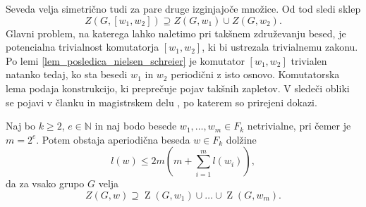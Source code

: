   Seveda velja simetrično tudi za pare druge izginjajoče množice. Od tod sledi sklep \begin{equation*}
  Z(G, [w_1, w_2]) \supseteq Z(G, w_1) \cup Z(G, w_2).
  \end{equation*}  
Glavni problem, na katerega lahko naletimo pri takšnem združevanju besed, je potencialna trivialnost komutatorja $[w_1, w_2]$, ki bi ustrezala trivialnemu zakonu.
Po lemi \ref{lem_posledica_nielsen_schreier} je komutator $[w_1, w_2]$ trivialen natanko tedaj, ko sta besedi $w_1$ in $w_2$ periodični z isto osnovo. 
Komutatorska lema podaja konstrukcijo, ki preprečuje pojav takšnih zapletov. V sledeči obliki se pojavi v članku \cite{Kozma_Thom_2016} in magistrskem delu \cite{Schneider_2016}, po katerem so prirejeni dokazi.

\begin{lema}
    \label{lem_komutatorska_lema}
     Naj bo $k \ge 2$, $e \in  \mathbb{N}$ in naj bodo besede $w_1, \ldots, w_m \in F_k$ netrivialne, pri čemer je $m = 2^{e}$. Potem obstaja aperiodična beseda $w \in F_k$
     dolžine \begin{equation*}
     l(w) \le 2m \left(m + \sum_{i=1}^{m} l(w_{i}) \right),
     \end{equation*}  
    da za vsako grupo $G$ velja \begin{equation*}
    Z(G, w) \supseteq \operatorname{Z}(G, w_1) \cup \ldots \cup \operatorname{Z}(G, w_m).
    \end{equation*}       
\end{lema}
